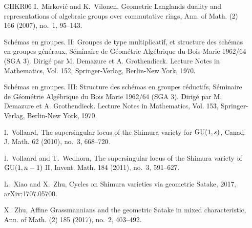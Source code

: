 \documentclass[12pt,a4paper]{article}
\begin{document}
\begin{thebibliography}{GHKR06}
	I.~Mirkovi\'{c} and K.~Vilonen, Geometric {L}anglands duality and
	representations of algebraic groups over commutative rings, Ann. of Math. (2)
	166 (2007), no.~1, 95--143.
	
	Sch\'{e}mas en groupes. {II}: {G}roupes de type multiplicatif, et structure des
	sch\'{e}mas en groupes g\'{e}n\'{e}raux, S\'{e}minaire de G\'{e}om\'{e}trie
	Alg\'{e}brique du Bois Marie 1962/64 (SGA 3). Dirig\'{e} par M. Demazure et
	A. Grothendieck. Lecture Notes in Mathematics, Vol. 152, Springer-Verlag,
	Berlin-New York, 1970.
	
	Sch\'emas en groupes. {III}: {S}tructure des sch\'emas en groupes r\'eductifs,
	S\'eminaire de G\'eom\'etrie Alg\'ebrique du Bois Marie 1962/64 (SGA 3).
	Dirig\'e par M. Demazure et A. Grothendieck. Lecture Notes in Mathematics,
	Vol. 153, Springer-Verlag, Berlin-New York, 1970.
	
	I.~Vollaard, The supersingular locus of the {S}himura variety for {${\rm
			GU}(1,s)$}, Canad. J. Math. 62 (2010), no.~3, 668--720.
	
	I.~Vollaard and T.~Wedhorn, The supersingular locus of the {S}himura variety of
	{${\rm GU}(1,n-1)$} {II}, Invent. Math. 184 (2011), no.~3, 591--627.
	
	L.~Xiao and X.~Zhu, Cycles on Shimura varieties via geometric Satake, 2017,
	arXiv:1707.05700.
	
	X.~Zhu, Affine {G}rassmannians and the geometric {S}atake in mixed
	characteristic, Ann. of Math. (2) 185 (2017), no.~2, 403--492.
	
\end{thebibliography}
\end{document}
